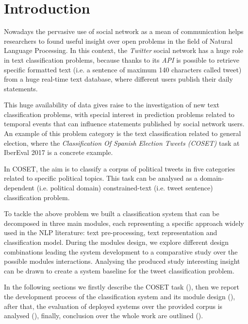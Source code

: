 \section{Introduction} \label{sec:introduction}

Nowadays the pervasive use of social network as a mean of communication helps researchers to found useful insight over open problems in the field of Natural Language Processing. %
In this context, the \emph{Twitter} social network has a huge role in text classification problems, because thanks to its \emph{API} is possible to retrieve specific formatted text (i.e. a sentence of maximum 140 characters called tweet) from a huge real-time text database, where different users publish their daily statements.

This huge availability of data gives raise to the investigation of new text classification problems, with special interest in prediction problems related to temporal events that can influence statements published by social network users. An example of this problem category is the text classification related to general election, where the  \emph{Classification Of Spanish Election Tweets (COSET)} task at IberEval 2017 is a concrete example. %

In COSET, the aim is to classify a corpus of political tweets in five categories related to specific political topics. This task can be analysed as a domain-dependent (i.e. political domain) constrained-text (i.e. tweet sentence) classification problem.

To tackle the above problem we built a classification system that can be decomposed in three main modules, each representing a specific approach widely used in the NLP literature: text pre-processing, text representation and classification model.
During the modules design, we explore different design combinations leading the system development to a comparative study over the possible modules interactions.
Analysing the produced study interesting insight can be drawn to create a system baseline for the tweet classification problem.

In the following sections we firstly describe the COSET task (), then we report the development process of the classification system and its module design (), after that, the evaluation of deployed systems over the provided corpus is analysed (), finally, conclusion over the whole work are outlined ().



